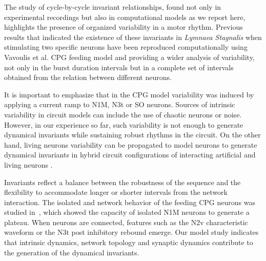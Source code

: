 The study of cycle-by-cycle invariant relationships, found not only in experimental recordings but also in computational models as we report here, highlights the presence
of organized variability in a motor rhythm. Previous results that indicated the existence of these invariants in \textit{Lymnaea Stagnalis} when stimulating two specific neurons have been reproduced computationally using Vavoulis et al. CPG feeding model and providing a wider analysis of variability, not only in the burst duration intervals but in a complete set of intervals obtained from the relation between different neurons.%

It is important to emphasize that in the CPG model variability was induced by applying a current ramp to N1M, N3t or SO neurons. Sources of intrinsic variability in circuit models can include the use of chaotic neurons \cite{Elices2015,elices17} or noise. However, in our experience so far, such variability is not enough to generate dynamical invariants while sustaining robust rhythms in the circuit. On the other hand, living neurons variability can be propagated to model neurons to generate dynamical invariants in hybrid circuit configurations of interacting artificial and living neurons \cite{Amaducci2019,Reyes-Sanchez2020}.

Invariants reflect a balance between the robustness of the sequence and the flexibility to accommodate longer or shorter intervals from the network interaction. The isolated and network behavior of the feeding CPG neurons was studied in~\cite{Straub2002a}, which showed the capacity of isolated N1M neurons to generate a plateau. When neurons are connected, features such as the N2v characteristic waveform or the N3t post inhibitory rebound emerge. Our model study indicates that intrinsic dynamics, network topology and synaptic dynamics contribute to the generation of the dynamical invariants.



